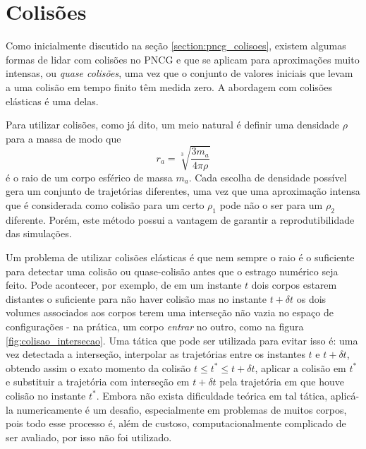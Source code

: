 \section{Colisões}\label{section:simulacao_colisoes}
Como inicialmente discutido na seção \ref{section:pncg_colisoes}, existem algumas formas de lidar com colisões no PNCG e que se aplicam para aproximações muito intensas, ou \textit{quase colisões}, uma vez que o conjunto de valores iniciais que levam a uma colisão em tempo finito têm medida zero. A abordagem com colisões elásticas é uma delas.

Para utilizar colisões, como já dito, um meio natural é definir uma densidade $\rho$ para a massa de modo que
\begin{equation}
    r_a = \sqrt[3]{\dfrac{3 m_a}{4 \pi \rho}}
\end{equation}
é o raio de um corpo esférico de massa $m_a$. Cada escolha de densidade possível gera um conjunto de trajetórias diferentes, uma vez que uma aproximação intensa que é considerada como colisão para um certo $\rho_1$ pode não o ser para um $\rho_2$ diferente. Porém, este método possui a vantagem de garantir a reprodutibilidade das simulações.

Um problema de utilizar colisões elásticas é que nem sempre o raio é o suficiente para detectar uma colisão ou quase-colisão antes que o estrago numérico seja feito. Pode acontecer, por exemplo, de em um instante $t$ dois corpos estarem distantes o suficiente para não haver colisão mas no instante $t + \delta t$ os dois volumes associados aos corpos terem uma interseção não vazia no espaço de configurações - na prática, um corpo \textit{entrar} no outro, como na figura \ref{fig:colisao_intersecao}. Uma tática que pode ser utilizada para evitar isso é: uma vez detectada a interseção, interpolar as trajetórias entre os instantes $t$ e $t+\delta t$, obtendo assim o exato momento da colisão $t \leq t^* \leq t+\delta t$, aplicar a colisão em $t^*$ e substituir a trajetória com interseção em $t + \delta t$ pela trajetória em que houve colisão no instante $t^*$. Embora não exista dificuldade teórica em tal tática, aplicá-la numericamente é um desafio, especialmente em problemas de muitos corpos, pois todo esse processo é, além de custoso, computacionalmente complicado de ser avaliado, por isso não foi utilizado.

